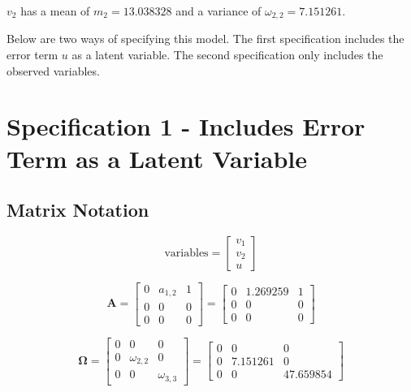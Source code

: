 \documentclass[
]{book}
\begin{document}
\noindent \(v_2\) has a mean of \(m_2 = 13.038328\) and a variance of \(\omega_{2, 2} = 7.151261\).

Below are two ways of specifying this model.
The first specification includes the error term \(u\) as a latent variable.
The second specification only includes the observed variables.

\hypertarget{specification-1---includes-error-term-as-a-latent-variable}{%
\section{Specification 1 - Includes Error Term as a Latent Variable}\label{specification-1---includes-error-term-as-a-latent-variable}}

\hypertarget{matrix-notation}{%
\subsection{Matrix Notation}\label{matrix-notation}}

\begin{equation}
  \mathrm{variables}
  =
  \begin{bmatrix}
    v_1 \\
    v_2 \\
    u
  \end{bmatrix}
\end{equation}

\begin{equation}
  \mathbf{A}
  =
  \begin{bmatrix}
    0 & a_{1, 2} & 1 \\
    0 & 0        & 0 \\
    0 & 0        & 0
  \end{bmatrix}
  =
  \begin{bmatrix}
    0 & 1.269259 & 1 \\
    0 & 0 & 0 \\
    0 & 0 & 0
  \end{bmatrix}
\end{equation}

\begin{equation}
  \boldsymbol{\Omega}
  =
  \begin{bmatrix}
    0 & 0             & 0 \\
    0 & \omega_{2, 2} & 0 \\
    0 & 0             & \omega_{3, 3}
  \end{bmatrix}
  =
  \begin{bmatrix}
    0 & 0 & 0 \\
    0 & 7.151261 & 0 \\
    0 & 0 & 47.659854
  \end{bmatrix}
\end{equation}
\end{document}
